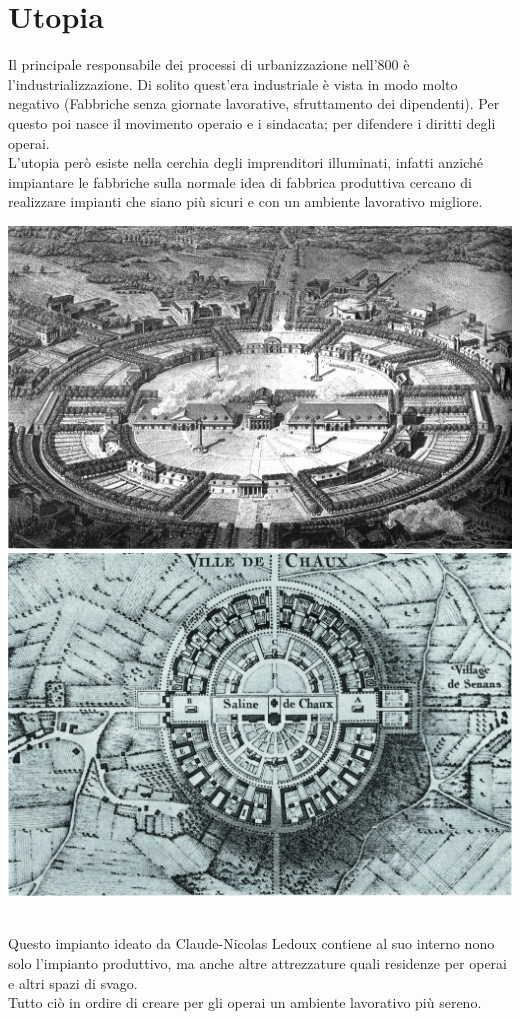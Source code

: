 \documentclass[a4paper,12pt, oneside]{book}
\begin{document}
    \section{Utopia}
    Il principale responsabile dei processi di urbanizzazione nell'800 è l'industrializzazione. Di solito quest'era industriale è vista in modo molto negativo (Fabbriche senza giornate lavorative, sfruttamento dei dipendenti). Per questo poi nasce il movimento operaio e i sindacata; per difendere i diritti degli operai.\\
    L'utopia però esiste nella cerchia degli imprenditori illuminati, infatti anziché impiantare le fabbriche sulla normale idea di fabbrica produttiva cercano di realizzare impianti che siano più sicuri e con un ambiente lavorativo migliore.
    	\leavevmode\\
    \begin{center}
    	\includegraphics[width=0.6\linewidth]{"immagini/Salina de Chaux"}
    	\\
    	\includegraphics[width=0.6\linewidth]{"immagini/Salina de Chaux top"}
    \end{center}
    \leavevmode\\
    Questo impianto ideato da Claude-Nicolas Ledoux contiene al suo interno nono solo l'impianto produttivo, ma anche altre attrezzature quali residenze per operai e altri spazi di svago.\\
    Tutto ciò in ordire di creare per gli operai un ambiente lavorativo più sereno.\\
\end{document}
